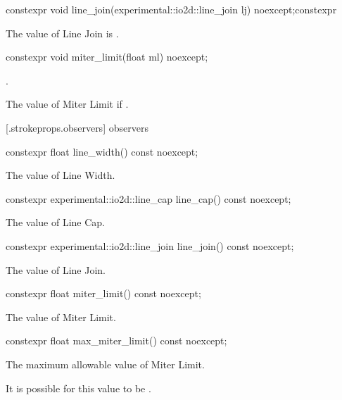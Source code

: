\begin{itemdecl}
constexpr void line_join(experimental::io2d::line_join lj) noexcept;constexpr \end{itemdecl}
\begin{itemdescr}
\pnum
\effects
The value of Line Join is .
\end{itemdescr}

\begin{itemdecl}
constexpr void miter_limit(float ml) noexcept;
\end{itemdecl}
\begin{itemdescr}
\pnum
\requires
{}.

\pnum
The value of Miter Limit if .
\end{itemdescr}

 [\iotwod.strokeprops.observers] { observers}

\begin{itemdecl}
constexpr float line_width() const noexcept;
\end{itemdecl}
\begin{itemdescr}
\pnum
\returns
The value of Line Width.
\end{itemdescr}

\begin{itemdecl}
constexpr experimental::io2d::line_cap line_cap() const noexcept;
\end{itemdecl}
\begin{itemdescr}
\pnum
\returns
The value of Line Cap.
\end{itemdescr}

\begin{itemdecl}
constexpr experimental::io2d::line_join line_join() const noexcept;
\end{itemdecl}
\begin{itemdescr}
\pnum
\returns
The value of Line Join.
\end{itemdescr}

\begin{itemdecl}
constexpr float miter_limit() const noexcept;
\end{itemdecl}
\begin{itemdescr}
\pnum
\returns
The value of Miter Limit.
\end{itemdescr}

\begin{itemdecl}
constexpr float max_miter_limit() const noexcept;
\end{itemdecl}
\begin{itemdescr}
\pnum
\returns
The  maximum allowable value of Miter Limit.

\pnum
\remarks
It is possible for this value to be .
\end{itemdescr}
